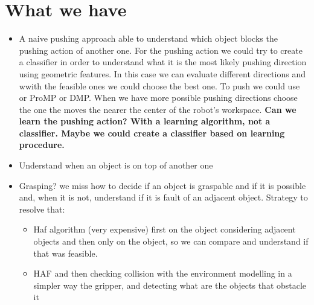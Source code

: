 \section{What we have}
\begin{itemize}
\item A naive pushing approach able to understand which object blocks the pushing action of another one.
For the pushing action we could try to create a classifier in order to understand what it is the most likely pushing direction using geometric features. In this case we can evaluate different directions and wwith the feasible ones we could choose the best one. 
To push we could use or ProMP or DMP. When we have more possible pushing directions choose the one the moves the nearer the center of the robot's workspace.
\textbf{Can we learn the pushing action? With a learning algorithm, not a classifier. Maybe we could create a classifier based on learning procedure.}
\item Understand when an object is on top of another one
\item Grasping? we miss how to decide if an object is graspable and if it is possible and, when it is not, understand if it is fault of an adjacent object. 
Strategy to resolve that:
\begin{itemize}
\item Haf algorithm (very expensive) first on the object considering adjacent objects and then only on the object, so we can compare and understand if that was feasible. 
\item HAF and then checking collision with the environment modelling in a simpler way the gripper, and detecting what are the objects that obstacle it


\end{itemize}
\end{itemize}
